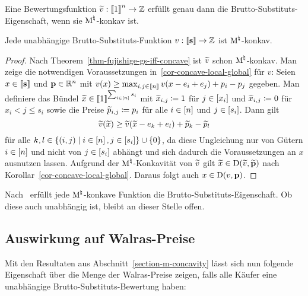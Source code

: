 \begin{theorem}\label{thm-fujishige-gs-iff-concave}
	Eine Bewertungsfunktion $\widetilde{v}:\left\llbracket 1 \right\rrbracket^n\rightarrow \mathbb{Z}$ erfüllt genau dann die Brutto-Substituts-Eigenschaft, wenn sie $\textrm{\textup{M}}^\natural$-konkav ist.
\end{theorem}
\begin{korollar}\label{cor-indep-gs-m-concave}
	Jede unabhängige Brutto-Substituts-Funktion $v:\left\llbracket \mathbf{s} \right\rrbracket \rightarrow \mathbb{Z}$ ist $\textrm{\textup{M}}^\natural$-konkav.
\end{korollar}
\begin{proof}
	Nach Theorem~\ref{thm-fujishige-gs-iff-concave} ist $\widetilde{v}$ schon $\textrm{\textup{M}}^\natural$-konkav.
	Man zeige die notwendigen Voraussetzungen in~\ref{cor-concave-local-global} für $v$:
	Seien $x\in\left\llbracket \mathbf{s} \right\rrbracket$ und $\mathbf{p}\in\mathbb{R}^n$ mit $v(x)\geq \max_{i,j\in\left\llbracket n \right\rrbracket} v(x - e_i + e_j) + p_i - p_j$ gegeben.
	Man definiere das Bündel $\widetilde{x}\in\left\llbracket 1 \right\rrbracket^{\sum_{i\in\left[ n \right]} s_i}$ mit $\widetilde{x}_{i,j} \coloneqq 1$ für $j\in\left[ x_i \right]$ und $\widetilde{x}_{i,j} \coloneqq 0$ für $x_i < j \leq s_i$ sowie die Preise $\widetilde{p}_{i,j}\coloneqq p_i$ für alle $i\in\left[ n \right]$ und $j\in\left[ s_i \right]$.
	Dann
	gilt \[
	\widetilde{v}(\widetilde{x}) \geq \widetilde{v}(\widetilde{x} - e_k + e_l) + \widetilde{p}_k - \widetilde{p}_l
	\] für alle $k, l \in \{ (i,j) \mid i\in\left[ n \right], j\in\left[ s_i \right] \}\cup\{ 0 \}$, da diese Ungleichung nur von Gütern $i\in\left[ n \right]$ und nicht von $j\in\left[ s_i \right]$ abhängt und sich dadurch die Voraussetzungen an $x$ ausnutzen lassen.
	Aufgrund der $\textrm{\textup{M}}^\natural$-Konkavität von $\widetilde{v}$ gilt $\widetilde{x}\in\operatorname{D}(\widetilde{v}, \widetilde{\mathbf{p}})$ nach Korollar~\ref{cor-concave-local-global}. Daraus folgt auch $x\in\operatorname{D}(v,\mathbf{p})$.
\end{proof}
\begin{bemerkung}
	Nach~\cite[Theorem~11.4]{Murota2003} erfüllt jede $\textrm{\textup{M}}^\natural$-konkave Funktion die Brutto-Substituts-Eigenschaft.
	Ob diese auch unabhängig ist, bleibt an dieser Stelle offen.
\end{bemerkung}

\subsection{Auswirkung auf Walras-Preise}

Mit den Resultaten aus Abschnitt~\ref{section-m-concavity} lässt sich nun folgende Eigenschaft über die Menge der Walras-Preise zeigen, falls alle Käufer eine unabhängige Brutto-Substituts-Bewertung haben:

